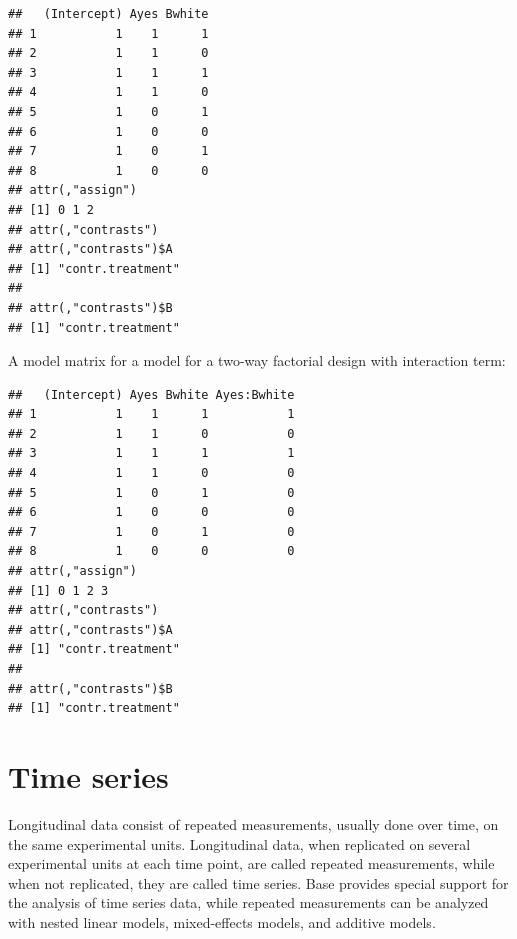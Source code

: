 \documentclass[krantz2]{krantz}\usepackage{knitr}
\begin{document}
\begin{explainbox}
\begin{knitrout}\footnotesize
{}\color{fgcolor}\begin{kframe}
\begin{alltt}
\hlstd{(}\hlopt{~}  \hlopt{+} 
\end{alltt}
\begin{verbatim}
##   (Intercept) Ayes Bwhite
## 1           1    1      1
## 2           1    1      0
## 3           1    1      1
## 4           1    1      0
## 5           1    0      1
## 6           1    0      0
## 7           1    0      1
## 8           1    0      0
## attr(,"assign")
## [1] 0 1 2
## attr(,"contrasts")
## attr(,"contrasts")$A
## [1] "contr.treatment"
## 
## attr(,"contrasts")$B
## [1] "contr.treatment"
\end{verbatim}
\end{kframe}
\end{knitrout}

A model matrix for a model for a two-way factorial design with interaction term:

\begin{knitrout}\footnotesize
{}\color{fgcolor}\begin{kframe}
\begin{alltt}
\hlstd{(}\hlopt{~}  \hlopt{*} 
\end{alltt}
\begin{verbatim}
##   (Intercept) Ayes Bwhite Ayes:Bwhite
## 1           1    1      1           1
## 2           1    1      0           0
## 3           1    1      1           1
## 4           1    1      0           0
## 5           1    0      1           0
## 6           1    0      0           0
## 7           1    0      1           0
## 8           1    0      0           0
## attr(,"assign")
## [1] 0 1 2 3
## attr(,"contrasts")
## attr(,"contrasts")$A
## [1] "contr.treatment"
## 
## attr(,"contrasts")$B
## [1] "contr.treatment"
\end{verbatim}
\end{kframe}
\end{knitrout}

\end{explainbox}

\section{Time series}\label{sec:stat:time:series}
Longitudinal data consist of repeated measurements, usually done over time, on the same experimental units. Longitudinal data, when replicated on several experimental units at each time point, are called repeated measurements, while when not replicated, they are called time series. Base \Rlang provides special support for the analysis of time series data, while repeated measurements can be analyzed with nested linear models, mixed-effects models, and additive models.
\end{document}
